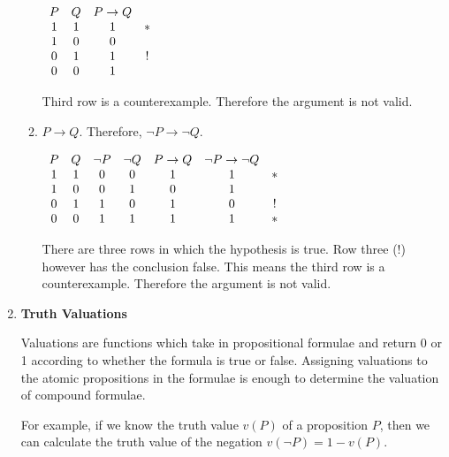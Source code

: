 \documentclass[11pt]{report}
\begin{document}
\begin{enumerate}
\begin{enumerate}
		\begin{center}
			$\begin{array}{c c c c}
				P & Q & P \to Q & \ \\
				1 & 1 & 1 & * \\
				1 & 0 & 0 & \ \\
				0 & 1 & 1 & ! \\
				0 & 0 & 1 & \
			\end{array}$
		\end{center}

		Third row is a counterexample. Therefore the argument is not valid.

		\item $P \rightarrow Q$. Therefore, $\lnot P \rightarrow \lnot Q$. 
		
		\hspace{0.2cm}{\bf Solution}

		\begin{center}
			$\begin{array}{c c c c c c c}
				P & Q & \lnot P & \lnot Q & P \to Q & \lnot P \to \lnot Q & \ \\
				1 & 1 & 0 & 0 & 1 & 1 & * \\
				1 & 0 & 0 & 1 & 0 & 1 & \ \\
				0 & 1 & 1 & 0 & 1 & 0 & ! \\
				0 & 0 & 1 & 1 & 1 & 1 & * 
			\end{array}$
		\end{center}

		There are three rows in which the hypothesis is true. Row three (!) however has the conclusion false. This means the third row is a counterexample. Therefore the argument is not valid. 

	\end{enumerate}

	\newpage
	\item {\bf Truth Valuations} 
	
	Valuations are functions which take in propositional formulae and return 0 or 1 according to whether the formula is true or false. Assigning valuations to the atomic propositions in the formulae is enough to determine the valuation of compound formulae. 

	\vspace{0.2cm}

	For example, if we know the truth value $v(P)$ of a proposition $P$, then we can calculate the truth value of the negation $v(\lnot P) = 1 - v(P)$. 

	\vspace{0.2cm}


\end{enumerate}
\end{document}

